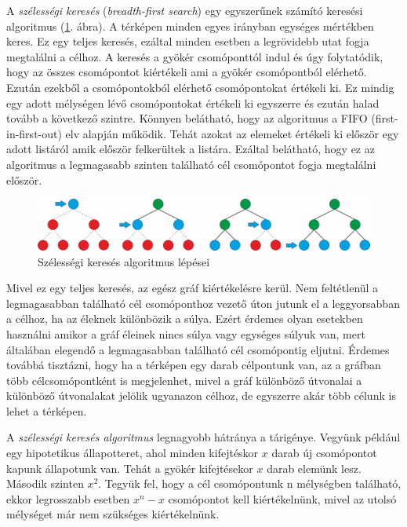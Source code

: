 A \textit{szélességi keresés} (\textit{breadth-first search}) egy egyszerűnek számító keresési algoritmus (\ref{fig:breadth-first_search}. ábra). A térképen minden egyes irányban egységes mértékben keres. Ez egy teljes keresés, ezáltal minden esetben a legrövidebb utat fogja megtalálni a célhoz. A keresés a gyökér csomóponttól indul és úgy folytatódik, hogy az összes csomópontot kiértékeli ami a gyökér csomópontból elérhető. Ezután ezekből a csomópontokból elérhető csomópontokat értékeli ki. Ez mindig egy adott mélységen lévő csomópontokat értékeli ki egyszerre és ezután halad tovább a következő szintre. Könnyen belátható, hogy az algoritmus a FIFO (first-in-first-out) elv alapján működik. Tehát azokat az elemeket értékeli ki először egy adott listáról amik először felkerültek a listára. Ezáltal belátható, hogy ez az algoritmus a legmagasabb szinten található cél csomópontot fogja megtalálni először. 

\begin{figure}[h!]
\centering
\includegraphics[scale=0.4]{kepek/breadth-first_search.jpg}
\caption{Szélességi keresés algoritmus lépései}
\label{fig:breadth-first_search}
\end{figure}

\newpage
Mivel ez egy teljes keresés, az egész gráf kiértékelésre kerül. Nem feltétlenül a legmagasabban található cél csomóponthoz vezető úton jutunk el a leggyorsabban a célhoz, ha az éleknek különbözik a súlya. Ezért érdemes olyan esetekben használni amikor a gráf éleinek nincs súlya vagy egységes súlyuk van, mert általában elegendő a legmagasabban található cél csomópontig eljutni. Érdemes továbbá tisztázni, hogy ha a térképen egy darab célpontunk van, az a gráfban több célcsomópontként is megjelenhet, mivel a gráf különböző útvonalai a különböző útvonalakat jelölik ugyanazon célhoz, de egyszerre akár több célunk is lehet a térképen.

A \textit{szélességi keresés algoritmus} legnagyobb hátránya a tárigénye. Vegyünk például egy hipotetikus állapotteret, ahol minden kifejtéskor $x$ darab új csomópontot kapunk állapotunk van. Tehát a gyökér kifejtésekor $x$ darab elemünk lesz. Második szinten $x^2$. Tegyük fel, hogy a cél csomópontunk n mélységben található, ekkor legrosszabb esetben $x^n - x$ csomópontot kell kiértékelnünk, mivel az utolsó mélységet már nem szükséges kiértékelnünk. 

